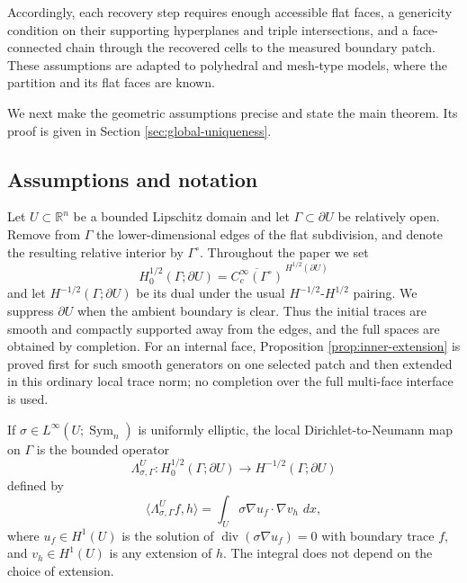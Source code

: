 \documentclass[11pt,oneside]{article}
\newcommand{\R}{\mathbb R}
\newcommand{\dd}{\,d}
\newcommand{\DN}{\Lambda}
\newcommand{\Sym}{\operatorname{Sym}}
\newcommand{\diver}{\operatorname{div}}
\begin{document}
Accordingly, each recovery step requires enough accessible flat faces, a
genericity condition on their supporting hyperplanes and triple intersections,
and a face-connected chain through the recovered cells to the measured boundary
patch.  These assumptions are adapted to polyhedral and mesh-type models, where
the partition and its flat faces are known.

We next make the geometric assumptions precise and state the main theorem.  Its
proof is given in Section \ref{sec:global-uniqueness}.

\subsection{Assumptions and notation}
\label{sec:local-dn}

Let \(U\subset\R^n\) be a bounded Lipschitz domain and let
\(\Gamma\subset\partial U\) be relatively open.  Remove from \(\Gamma\) the
lower-dimensional edges of the flat subdivision, and denote the resulting
relative interior by \(\Gamma^\circ\).  Throughout the paper we set
\begin{equation}
  H^{1/2}_0(\Gamma;\partial U)
  =\overline{C_c^\infty(\Gamma^\circ)}^{\,H^{1/2}(\partial U)}
\end{equation}
and let \(H^{-1/2}(\Gamma;\partial U)\) be its dual under the usual
\(H^{-1/2}\)-\(H^{1/2}\) pairing.  We suppress \(\partial U\) when the ambient
  boundary is clear.  Thus the initial traces are smooth and compactly supported
  away from the edges, and the full spaces are obtained by completion.  For an
  internal face, Proposition \ref{prop:inner-extension} is proved first for such
  smooth generators on one selected patch and then extended in this ordinary
  local trace norm; no completion over the full multi-face interface is used.

If \(\sigma\in L^\infty(U;\Sym_n)\) is uniformly elliptic, the local
Dirichlet-to-Neumann map on \(\Gamma\) is the bounded operator
\begin{equation}
  \DN^U_{\sigma,\Gamma}:H^{1/2}_0(\Gamma;\partial U)
     \to H^{-1/2}(\Gamma;\partial U)
\end{equation}
defined by
\begin{equation}
  \langle \DN^U_{\sigma,\Gamma}f,h\rangle
  =\int_U \sigma\nabla u_f\cdot \nabla v_h\,\dd x,
  \label{eq:local-dn}
\end{equation}
where \(u_f\in H^1(U)\) is the solution of
\(\diver(\sigma\nabla u_f)=0\) with boundary trace \(f\), and
\(v_h\in H^1(U)\) is any extension of \(h\).  The integral does not depend on
the choice of extension.
\end{document}
